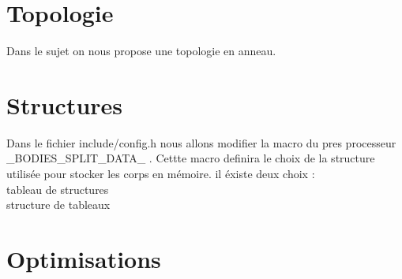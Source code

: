 \section{Topologie}
Dans le sujet on nous propose une topologie en anneau.

\section{Structures}
Dans le fichier include/config.h nous allons modifier la macro du pres processeur \_BODIES\_SPLIT\_DATA\_ .
Cettte macro definira le choix de la structure utilisée pour stocker les corps en mémoire.
il éxiste deux choix : \\
tableau de structures\\
structure de tableaux\\

\section{Optimisations}



